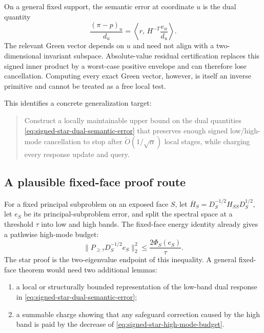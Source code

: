 On a general fixed support, the semantic error at coordinate $u$ is the dual
quantity
\begin{equation}
  \frac{(\pi-p)_u}{d_u}
  =\left\langle
      r,\,H^{-T}\frac{e_u}{d_u}
    \right\rangle.
  \label{eq:signed-star-dual-semantic-error}
\end{equation}
The relevant Green vector depends on $u$ and need not align with a
two-dimensional invariant subspace.  Absolute-value residual certification
replaces this signed inner product by a worst-case positive envelope and can
therefore lose cancellation.  Computing every exact Green vector, however,
is itself an inverse primitive and cannot be treated as a free local test.

This identifies a concrete generalization target:
\begin{quote}
Construct a locally maintainable upper bound on the dual quantities
\eqref{eq:signed-star-dual-semantic-error} that preserves enough signed
low/high-mode cancellation to stop after $\widetilde O(1/\sqrt\alpha)$ local
stages, while charging every response update and query.
\end{quote}

\subsection{A plausible fixed-face proof route}

For a fixed principal subproblem on an exposed face $S$, let
\(\overline H_S=D_S^{-1/2}H_{SS}D_S^{1/2}\), let $e_S$ be its
principal-subproblem error, and split the spectral space at a threshold
$\tau$ into low and high bands.  The fixed-face energy identity already gives
a pathwise high-mode budget:
\begin{equation}
  \|P_{\ge\tau}D_S^{-1/2}e_S\|_2^2
  \le\frac{2\Phi_S(e_S)}{\tau}.
  \label{eq:signed-star-high-mode-budget}
\end{equation}
The star proof is the two-eigenvalue endpoint of this inequality.  A general
fixed-face theorem would need two additional lemmas:

\begin{enumerate}[leftmargin=*]
\item a local or structurally bounded representation of the low-band dual
      response in \eqref{eq:signed-star-dual-semantic-error};
\item a summable charge showing that any safeguard correction caused by the
      high band is paid by the decrease of
      \eqref{eq:signed-star-high-mode-budget}.
\end{enumerate}

